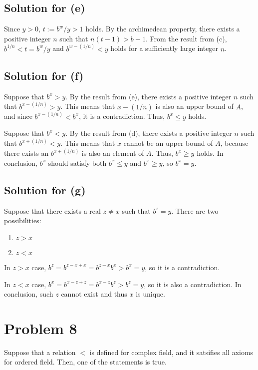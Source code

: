 \documentclass{scrartcl}
\begin{document}
\subsection{Solution for (e)}
Since \(y > 0\), \(t := b^w / y > 1\) holds.
By the archimedean property, there exists a positive integer \(n\) such that \(n(t - 1) > b - 1\).
From the result from (c), \(b^{1 / n} < t = b^w / y\) and \(b^{w - (1 / n)} < y\) holds for a sufficiently large integer \(n\).

\subsection{Solution for (f)}
Suppose that \(b^x > y\).
By the result from (e), there exists a positive integer \(n\) such that \(b^{x - (1 / n)} > y\).
This means that \(x - (1 / n)\) is also an upper bound of \(A\), and since \(b^{x - (1 / n)} < b^x\), it is a contradiction.
Thus, \(b^x \leq y\) holds.

Suppose that \(b^x < y\).
By the result from (d), there exists a positive integer \(n\) such that \(b^{x + (1 / n)} < y\).
This means that \(x\) cannot be an upper bound of \(A\), because there exists an \(b^{x + (1 / n)}\) is also an element of \(A\).
Thus, \(b^x \geq y\) holds.
In conclusion, \(b^x\) should satisfy both \(b^x \leq y\) and \(b^x \geq y\), so \(b^x = y\).

\subsection{Solution for (g)}
Suppose that there exists a real \(z \not = x\) such that \(b^z = y\).
There are two possibilities:

\begin{enumerate}
  \item \(z > x\)
  \item \(z < x\)
\end{enumerate}

In \(z > x\) case, \(b^z = b^{z - x + x} = b^{z - x} b^x > b^x = y\), so it is a contradiction.

In \(z < x\) case, \(b^x = b^{x - z + z} = b^{x - z} b^z > b^z = y\), so it is also a contradiction. In conclusion, such \(z\) cannot exist and thus \(x\) is unique.

\section{Problem 8}
Suppose that a relation \(<\) is defined for complex field, and it satsifies all axioms for ordered field. Then, one of the statements is true.
\end{document}
